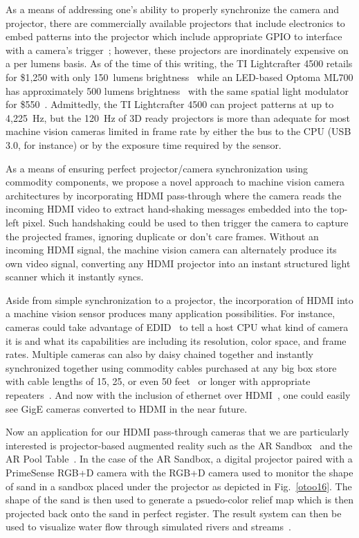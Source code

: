 \documentclass[]{spie}  %
\begin{document}
As a means of addressing one's ability to properly synchronize the camera and projector, there are commercially available projectors that include electronics to embed patterns into the projector which include appropriate GPIO to interface with a camera's trigger~\cite{otoo16,otoo16,otoo16}; however, these projectors are inordinately expensive on a per lumens basis.  As of the time of this writing, the TI Lightcrafter 4500 retails for \$1,250 with only 150~lumens brightness~\cite{otoo16} while an LED-based Optoma ML700 has approximately 500 lumens brightness~\cite{otoo16} with the same spatial light modulator for \$550~\cite{otoo16}. Admittedly, the TI Lightcrafter 4500 can project patterns at up to 4,225~Hz, but the 120~Hz of 3D ready projectors is more than adequate for most machine vision cameras limited in frame rate by either the bus to the CPU (USB 3.0, for instance) or by the exposure time required by the sensor.

As a means of ensuring perfect projector/camera synchronization using commodity components, we propose a novel approach to machine vision camera architectures by incorporating HDMI pass-through where the camera reads the incoming HDMI video to extract hand-shaking messages embedded into the top-left pixel. Such handshaking could be used to then trigger the camera to capture the projected frames, ignoring duplicate or don't care frames.  Without an incoming HDMI signal, the machine vision camera can alternately produce its own video signal, converting any HDMI projector into an instant structured light scanner which it instantly syncs.  

Aside from simple synchronization to a projector, the incorporation of HDMI into a machine vision sensor produces many application possibilities. For instance, cameras could take advantage of EDID~\cite{otoo16} to tell a host CPU what kind of camera it is and what its capabilities are including its resolution, color space, and frame rates.  Multiple cameras can also by daisy chained together and instantly synchronized together using commodity cables purchased at any big box store with cable lengths of 15, 25, or even 50 feet~\cite{otoo16} or longer with appropriate repeaters~\cite{otoo16}. And now with the inclusion of ethernet over HDMI~\cite{otoo16}, one could easily see GigE cameras converted to HDMI in the near future.

Now an application for our HDMI pass-through cameras that we are particularly interested is projector-based augmented reality such as the AR Sandbox~\cite{otoo16} and the AR Pool Table~\cite{otoo16}. In the case of the AR Sandbox, a digital projector paired with a PrimeSense RGB+D camera with the RGB+D camera used to monitor the shape of sand in a sandbox placed under the projector as depicted in Fig.~\ref{otoo16}.  The shape of the sand is then used to generate a psuedo-color relief map which is then projected back onto the sand in perfect register.  The result system can then be used to visualize water flow through simulated rivers and streams~\cite{otoo16}.  
\end{document}
